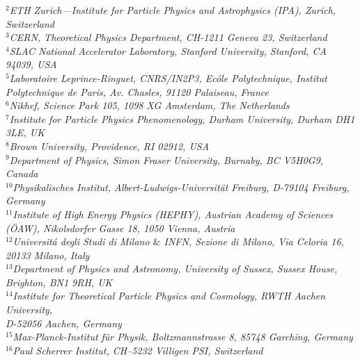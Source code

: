 \documentclass[11pt]{article}
\begin{document}
\begin{titlepage}
\begin{center}
           \textit{$^{2}$ETH Zurich—Institute for Particle Physics and Astrophysics (IPA), Zurich, Switzerland}\\
           \textit{$^{3}$CERN, Theoretical Physics Department, CH-1211 Geneva 23, Switzerland } \\
           \textit{$^{4}$SLAC National Accelerator Laboratory, Stanford University, Stanford, CA 94039, USA } \\
           \textit{$^{5}$Laboratoire Leprince-Ringuet, CNRS/IN2P3, Ecóle Polytechnique, Institut Polytechnique de Paris, Av. Chasles, 91120 Palaiseau, France}\\
           \textit{$^{6}$Nikhef, Science Park 105, 1098 XG Amsterdam, The Netherlands }\\
           \textit{$^{7}$Institute for Particle Physics Phenomenology, Durham University, Durham DH1 3LE, UK}\\
           \textit{$^{8}$Brown University, Providence, RI 02912, USA} \\
           \textit{$^{9}$Department of Physics, Simon Fraser University, Burnaby, BC V5H0G9, Canada}\\
           \textit{$^{10}$Physikalisches Institut, Albert-Ludwigs-Universit\"at Freiburg, D-79104 Freiburg, Germany} \\
           \textit{$^{11}$Institute of High Energy Physics (HEPHY), Austrian Academy of Sciences (\"{O}AW), Nikolsdorfer Gasse 18, 1050 Vienna, Austria}\\
           \textit{$^{12}$Universit\'{a} degli Studi di Milano $\&$ INFN, Sezione di Milano, Via Celoria 16, 20133 Milano, Italy}\\
           \textit{$^{13}$Department of Physics and Astronomy, University of Sussex, Sussex House, Brighton, BN1 9RH, UK}\\
           \textit{$^{14}$Institute for Theoretical Particle Physics and Cosmology, RWTH Aachen University, \\D-52056 Aachen, Germany}\\
           \textit{$^{15}$Max-Planck-Institut f\"ur Physik, Boltzmannstrasse 8, 85748 Garching, Germany}\\
           \textit{$^{16}$Paul Scherrer Institut, CH–5232 Villigen PSI, Switzerland}\\

\end{center}
\end{titlepage}
\end{document}
